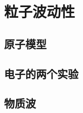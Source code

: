 

\section{粒子波动性}\label{29-2}

\subsection{原子模型}\label{29-2-1}

\subsection{电子的两个实验}\label{29-2-2}

\subsection{物质波}\label{29-2-3}